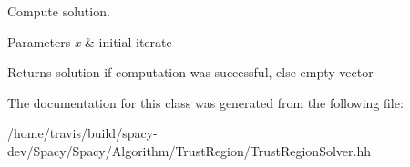 Compute solution. 


\begin{DoxyParams}{Parameters}
{\em x} & initial iterate \\
\hline
\end{DoxyParams}
\begin{DoxyReturn}{Returns}
solution if computation was successful, else empty vector 
\end{DoxyReturn}


The documentation for this class was generated from the following file\-:\begin{DoxyCompactItemize}
\item 
/home/travis/build/spacy-\/dev/\-Spacy/\-Spacy/\-Algorithm/\-Trust\-Region/Trust\-Region\-Solver.\-hh\end{DoxyCompactItemize}
